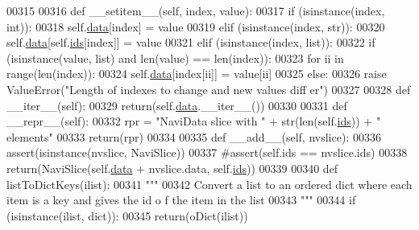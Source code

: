 \begin{DoxyCode}
00315 
00316     \textcolor{keyword}{def }\_\_setitem\_\_(self, index, value):
00317         \textcolor{keywordflow}{if} (isinstance(index, int)):
00318             self.\hyperlink{classnavicom_1_1navidata_1_1NaviSlice_a21ac86b9fbcb4ffc952782983690af5f}{data}[index] = value
00319         \textcolor{keywordflow}{elif} (isinstance(index, str)):
00320             self.\hyperlink{classnavicom_1_1navidata_1_1NaviSlice_a21ac86b9fbcb4ffc952782983690af5f}{data}[self.\hyperlink{classnavicom_1_1navidata_1_1NaviSlice_abc8769a0168ce54ee35624363deb0bcd}{ids}[index]] = value
00321         \textcolor{keywordflow}{elif} (isinstance(index, list)):
00322             \textcolor{keywordflow}{if} (isinstance(value, list) \textcolor{keywordflow}{and} len(value) == len(index)):
00323                 \textcolor{keywordflow}{for} ii \textcolor{keywordflow}{in} range(len(index)):
00324                     self.\hyperlink{classnavicom_1_1navidata_1_1NaviSlice_a21ac86b9fbcb4ffc952782983690af5f}{data}[index[ii]] = value[ii]
00325             \textcolor{keywordflow}{else}:
00326                 \textcolor{keywordflow}{raise} ValueError(\textcolor{stringliteral}{"Length of indexes to change and new values diff
      er"})
00327 
00328     \textcolor{keyword}{def }\_\_iter\_\_(self):
00329         \textcolor{keywordflow}{return}(self.\hyperlink{classnavicom_1_1navidata_1_1NaviSlice_a21ac86b9fbcb4ffc952782983690af5f}{data}.\_\_iter\_\_())
00330 
00331     \textcolor{keyword}{def }\_\_repr\_\_(self):
00332         rpr = \textcolor{stringliteral}{"NaviData slice with "} + str(len(self.\hyperlink{classnavicom_1_1navidata_1_1NaviSlice_abc8769a0168ce54ee35624363deb0bcd}{ids})) + \textcolor{stringliteral}{" elements"}
00333         \textcolor{keywordflow}{return}(rpr)
00334 
00335     \textcolor{keyword}{def }\_\_add\_\_(self, nvslice):
00336         \textcolor{keyword}{assert}(isinstance(nvslice, NaviSlice))
00337         \textcolor{comment}{#assert(self.ids == nvslice.ids)}
00338         \textcolor{keywordflow}{return}(NaviSlice(self.\hyperlink{classnavicom_1_1navidata_1_1NaviSlice_a21ac86b9fbcb4ffc952782983690af5f}{data} + nvslice.data, self.\hyperlink{classnavicom_1_1navidata_1_1NaviSlice_abc8769a0168ce54ee35624363deb0bcd}{ids}))
00339 
00340 \textcolor{keyword}{def }listToDictKeys(ilist):
00341     \textcolor{stringliteral}{"""}
00342 \textcolor{stringliteral}{    Convert a list to an ordered dict where each item is a key and gives the id o
      f the item in the list}
00343 \textcolor{stringliteral}{    """}
00344     \textcolor{keywordflow}{if} (isinstance(ilist, dict)):
00345         \textcolor{keywordflow}{return}(oDict(ilist))

\end{DoxyCode}
